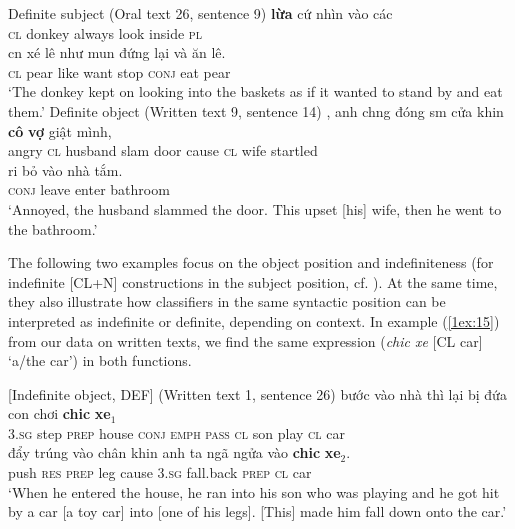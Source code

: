 \documentclass[output=paper]{langsci/langscibook}
\begin{document}
\begin{exe}
\ex\label{1ex:13}
Definite subject (Oral text 26, sentence 9) 
\exi{}
 {\textbf{lừa}}        cứ        nhìn vào    các  \\
{\textsc{cl}}  donkey  always look inside {\textsc{pl}}  \\
\glt
\exi{}
\gll c{\daab}n  {xé lê}   như  mu{\dao}n {đứng lại}  và        ăn   lê.   \\
{\textsc{cl}}  pear   like   want  stop         {\textsc{conj}}  eat  pear \\
\glt `The donkey kept on looking into the baskets as if it wanted to stand by and eat them.'
\ex\label{1ex:14}
Definite object (Written text 9, sentence 14) 
\exi{}
,  anh ch{\daob}ng      {đóng s{\daab}m}   cửa   khi{\dae}n  {\textbf{cô}}  {\textbf{vợ}}      {giật mình}, \\
angry         {\textsc{cl}}  husband   slam          door  cause  {\textsc{cl}} wife  startled \\
\glt 
\exi{}
\gll r{\daob}i        bỏ     vào     {nhà tắm}. \\
{\textsc{conj}}  leave enter   bathroom \\
\glt `Annoyed, the husband slammed the door. This upset [his] wife, then he went to the bathroom.'
\end{exe}

The following two examples focus on the object position and indefiniteness (for indefinite [CL+N] constructions in the subject position, cf. ). At the same time, they also illustrate how classifiers in the same syntactic position can be interpreted as indefinite or definite, depending on context. In example (\ref{1ex:15}) from our data on written texts, we find the same expression ({\emph{chi{\dae}c xe}} [CL car] `a/the car') in both functions.

\begin{exe}
\ex\label{1ex:15}
[Indefinite object, \pm DEF] (Written text 1, sentence 26)
\exi{}
 bước vào     nhà     thì         lại          bị        đứa  con  chơi  {\textbf{chi{\dae}c}} {\textbf{xe$_1$}}  \\
3.{\textsc{sg}}    step  {\textsc{prep}} house  {\textsc{conj}}   {\textsc{emph}}   {\textsc{pass}}  {\textsc{cl}}   son  play   {\textsc{cl}}  car \\
\glt
\gll đẩy    trúng  vào    chân  khi{\dae}n  {anh ta}  {ngã ngửa}  vào      {\textbf{chi{\dae}c}} {\textbf{xe$_2$}}. \\
push  {\textsc{res}}   {\textsc{prep}} leg    cause  3.{\textsc{sg}}    fall.back    {\textsc{prep}}  {\textsc{cl}} car \\
\glt `When he entered the house, he ran into his son who was playing and he got hit by a car [a toy car] into [one of his legs]. [This] made him fall down onto the car.'
\end{exe}
\end{document}
